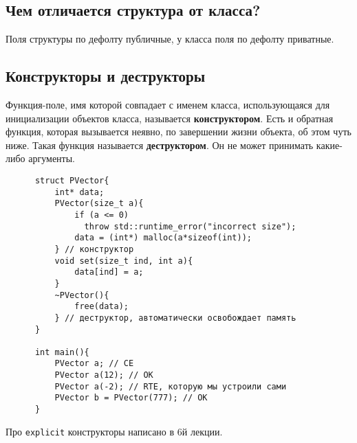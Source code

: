 \documentclass[15pt, a4paper]{article}
\begin{document}
  \subsection{Чем отличается структура от класса?}
  Поля структуры по дефолту публичные, у класса поля по дефолту приватные. \newpage
  \subsection{Конструкторы и деструкторы}
  Функция-поле, имя которой совпадает с именем класса, использующаяся для инициализации объектов класса,
  называется \textbf{конструктором}. Есть и обратная функция, которая вызывается неявно, по завершении жизни объекта, об этом чуть ниже.
  Такая функция называется \textbf{деструктором}. Он не может принимать какие-либо аргументы.
  \begin{verbatim}
      struct PVector{
          int* data;
          PVector(size_t a){
              if (a <= 0)
                throw std::runtime_error("incorrect size");
              data = (int*) malloc(a*sizeof(int));
          } // конструктор
          void set(size_t ind, int a){
              data[ind] = a;
          }
          ~PVector(){
              free(data);
          } // деструктор, автоматически освобождает память
      }

      int main(){
          PVector a; // CE
          PVector a(12); // OK
          PVector a(-2); // RTE, которую мы устроили сами
          PVector b = PVector(777); // OK
      }
  \end{verbatim}
  Про \texttt{explicit} конструкторы написано в 6й лекции.
\end{document}
